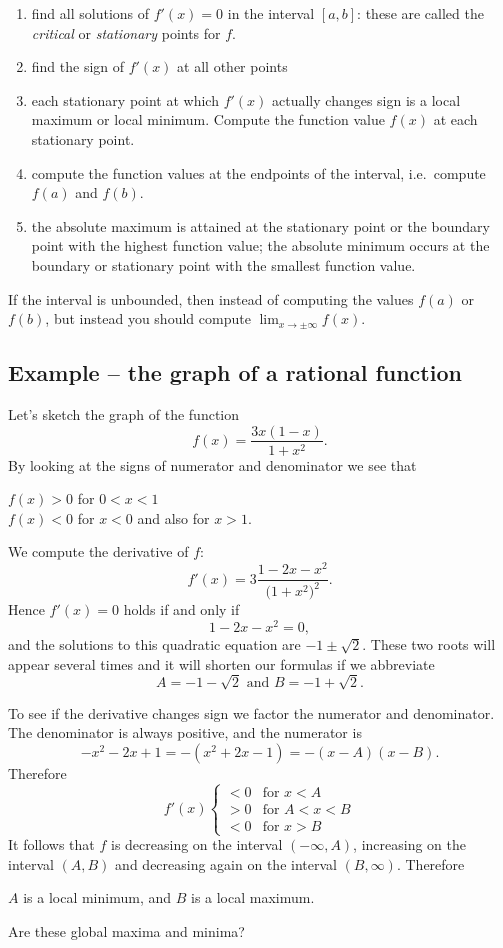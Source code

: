 \begin{enumerate}
\item find all solutions of $f'(x)=0$ in the interval $[a,b]$: these are called
  the \textit{critical} or \textit{stationary} points for $f$.
\item find the sign of $f'(x)$ at all other points
\item each stationary point at which $f'(x)$ actually changes sign is a local
  maximum or local minimum.  Compute the function value $f(x)$ at each
  stationary point.
\item compute the function values at the endpoints of the interval, i.e.\
  compute $f(a)$ and $f(b)$.
\item the absolute maximum is attained at the stationary point or the boundary
  point with the highest function value; the absolute minimum occurs at the
  boundary or stationary point with the smallest function value.
\end{enumerate}
If the interval is unbounded, then instead of computing the values $f(a)$ or
$f(b)$, but instead you should compute $\lim_{x\to\pm\infty}f(x)$.




\subsection{Example -- the graph of a rational function} %
Let's sketch the graph of the function
\[
f(x) = \frac{3x(1-x)}{1+x^2}.
\]
By looking at the signs of numerator and denominator we see that
\begin{center}
  $f(x)>0$ for $0<x<1$\\[2pt]
  $f(x)<0$ for $x<0$ and also for $x>1$.
\end{center}
We compute the derivative of $f$:
\[
f'(x) = 3\frac{1-2x-x^2}{\bigl(1+x^2\bigr)^2}.
\]
Hence $f'(x) = 0$ holds if and only if
\[
1-2x-x^2 = 0,
\]
and the solutions to this quadratic equation are $-1\pm\sqrt{2}$.  These two
roots will appear several times and it will shorten our formulas if we
abbreviate
\[
  A= -1 - \sqrt{2} \text{ and } B= -1+\sqrt{2} .
\]

To see if the derivative changes sign we factor the numerator and denominator.
The denominator is always positive, and the numerator is
\[
-x^2-2x+1 = -(x^2+2x-1) =-(x-A)(x-B).
\]
Therefore
\[
f'(x)
\begin{cases}
  <0 & \text{for }x<A \\
  >0 &\text{for } A<x<B \\
  <0 &\text{for } x>B
\end{cases}
\]\marginpar{\sffamily\footnotesize%
}%
It follows that $f$ is decreasing on the interval $(-\infty, A)$, increasing on
the interval $(A, B)$ and decreasing again on the interval $(B, \infty)$.
Therefore
\begin{center}
  $A$ is a local minimum, and $B$ is a local maximum.
\end{center}
Are these global maxima and minima?

